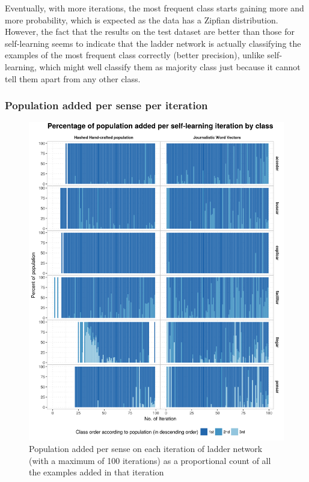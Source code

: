 Eventually, with more iterations, the most frequent class starts gaining more
and more probability, which is expected as the data has a Zipfian distribution.
However, the fact that the results on the test dataset are better than those
for self-learning seems to indicate that the ladder network is actually
classifying the examples of the most frequent class correctly (better
precision), unlike self-learning, which might well classify them as majority
class just because it cannot tell them apart from any other class.

\subsubsection{Population added per sense per iteration}

\begin{figure}[hb!]
  \centering
  \includegraphics[height=0.9\textheight,width=\textwidth,keepaspectratio]
    {plots/ladder/population_add_per_class_100}
  \caption{Population added per sense on each iteration of ladder network (with
  a maximum of 100 iterations) as a proportional count of all the examples
  added in that iteration}
  \label{fig:ladder:population_add_per_class:100}
\end{figure}

